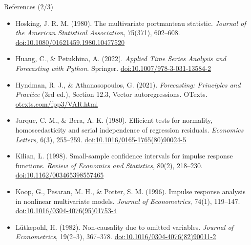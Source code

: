 \begin{frame}{References (2/3)}
\itemsize{\scriptsize}
\begin{itemize}
    \item Hosking, J. R. M. (1980). The multivariate portmanteau statistic. \textit{Journal of the American Statistical Association}, 75(371), 602--608. \href{https://doi.org/10.1080/01621459.1980.10477520}{doi:10.1080/01621459.1980.10477520}
    \item Huang, C., \& Petukhina, A. (2022). \textit{Applied Time Series Analysis and Forecasting with Python}. Springer. \href{https://doi.org/10.1007/978-3-031-13584-2}{doi:10.1007/978-3-031-13584-2}
    \item Hyndman, R. J., \& Athanasopoulos, G. (2021). \textit{Forecasting: Principles and Practice} (3rd ed.), Section 12.3, Vector autoregressions. OTexts. \href{https://otexts.com/fpp3/VAR.html}{otexts.com/fpp3/VAR.html}
    \item Jarque, C. M., \& Bera, A. K. (1980). Efficient tests for normality, homoscedasticity and serial independence of regression residuals. \textit{Economics Letters}, 6(3), 255--259. \href{https://doi.org/10.1016/0165-1765(80)90024-5}{doi:10.1016/0165-1765(80)90024-5}
    \item Kilian, L. (1998). Small-sample confidence intervals for impulse response functions. \textit{Review of Economics and Statistics}, 80(2), 218--230. \href{https://doi.org/10.1162/003465398557465}{doi:10.1162/003465398557465}
    \item Koop, G., Pesaran, M. H., \& Potter, S. M. (1996). Impulse response analysis in nonlinear multivariate models. \textit{Journal of Econometrics}, 74(1), 119--147. \href{https://doi.org/10.1016/0304-4076(95)01753-4}{doi:10.1016/0304-4076(95)01753-4}
    \item Lütkepohl, H. (1982). Non-causality due to omitted variables. \textit{Journal of Econometrics}, 19(2--3), 367--378. \href{https://doi.org/10.1016/0304-4076(82)90011-2}{doi:10.1016/0304-4076(82)90011-2}
\end{itemize}
\end{frame}

